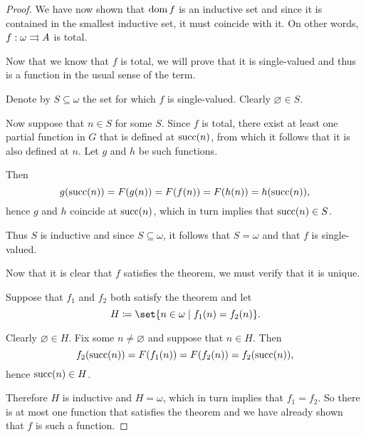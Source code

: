 \begin{proof}
  We have now shown that \( \operatorname{dom} f \) is an inductive set and since it is contained in the smallest inductive set, it must coincide with it. On other words, \( f: \omega \rightrightarrows A \) is total.

   Now that we know that \( f \) is total, we will prove that it is single-valued and thus is a function in the usual sense of the term.

  Denote by \( S \subseteq \omega \) the set for which \( f \) is single-valued. Clearly \( \varnothing \in S \).

  Now suppose that \( n \in S \) for some \( S \). Since \( f \) is total, there exist at least one partial function in \( G \) that is defined at \( \operatorname{succ}(n) \), from which it follows that it is also defined at \( n \). Let \( g \) and \( h \) be such functions.

  Then
  \begin{equation*}
    g(\operatorname{succ}(n)) = F(g(n)) = F(f(n)) = F(h(n)) = h(\operatorname{succ}(n)),
  \end{equation*}
  hence \( g \) and \( h \) coincide at \( \operatorname{succ}(n) \), which in turn implies that \( \operatorname{succ}(n) \in S \).

  Thus \( S \) is inductive and since \( S \subseteq \omega \), it follows that \( S = \omega \) and that \( f \) is single-valued.

   Now that it is clear that \( f \) satisfies the theorem, we must verify that it is unique.

  Suppose that \( f_1 \) and \( f_2 \) both satisfy the theorem and let
  \begin{equation*}
    H \coloneqq \set{ n \in \omega \given f_1(n) = f_2(n) }.
  \end{equation*}

  Clearly \( \varnothing \in H \). Fix some \( n \neq \varnothing \) and suppose that \( n \in H \). Then
  \begin{equation*}
    f_2(\operatorname{succ}(n)) = F(f_1(n)) = F(f_2(n)) = f_2(\operatorname{succ}(n)),
  \end{equation*}
  hence \( \operatorname{succ}(n) \in H \).

  Therefore \( H \) is inductive and \( H = \omega \), which in turn implies that \( f_1 = f_2 \). So there is at most one function that satisfies the theorem and we have already shown that \( f \) is such a function.
\end{proof}


